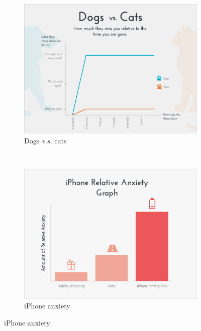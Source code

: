 \begin{figure}[ht!]

  \begin{subfigure}[c]{0.5\textwidth}
    \includegraphics[scale=0.18]{graphics/dogs_vs_cats.png}
    \caption{Dogs \textit{v.s.} cats}
    \label{fig:pets}
  \end{subfigure}
  \vspace{0.3cm}
  ~
  \begin{subfigure}[c]{0.5\textwidth}
    \includegraphics[scale=0.18]{graphics/iphone.png}
    \caption{iPhone anxiety}
    \label{fig:iphone}
  \end{subfigure}
  \vspace{0.3cm}
  

\end{figure}
